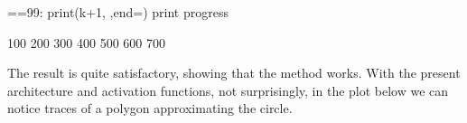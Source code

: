 \documentclass[a4paper,12pt,polish]{jupyterBook}
\begin{document}
\begin{sphinxVerbatimInput}

\begin{sphinxVerbatim}[commandchars=\\\{\}]
       
           
     ==99: print(k+1,\PYGZsq{} \PYGZsq{},end=\PYGZsq{}\PYGZsq{})             \PYGZsh{} print progress        
                       
\end{sphinxVerbatim}
\end{sphinxVerbatimInput}
\begin{sphinxVerbatimOutput}

\begin{sphinxVerbatim}[commandchars=\\\{\}]
100  200  300  400  500  600  700  
\end{sphinxVerbatim}
\end{sphinxVerbatimOutput}

\sphinxAtStartPar
The result is quite satisfactory, showing that the method works. With the present architecture and activation functions, not surprisingly, in the plot below we can notice traces of a polygon approximating the circle.
\begin{sphinxVerbatimOutput}

\noindent{}
\end{sphinxVerbatimOutput}
\end{document}

